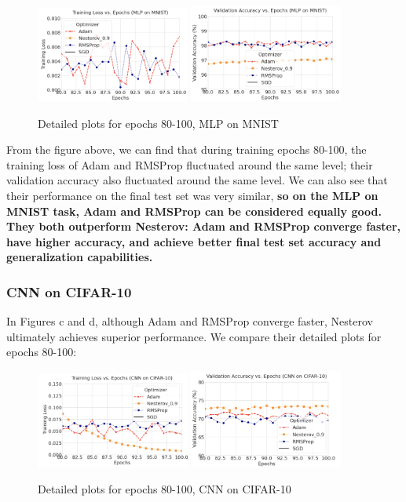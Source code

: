 \documentclass[12pt]{article}
\begin{document}
\begin{figure}[H]
    \centering
    \includegraphics[width=0.45\textwidth]{1-1.png}
    \includegraphics[width=0.45\textwidth]{1-2.png}
    \caption{Detailed plots for epochs 80-100, MLP on MNIST}
    \label{fig:detailed_mlp_on_mnist}
\end{figure}

From the figure above, we can find that during training epochs 80-100, the training loss of Adam and RMSProp fluctuated around the same level; their validation accuracy also fluctuated around the same level. We can also see that their performance on the final test set was very similar, \textbf{so on the MLP on MNIST task, Adam and RMSProp can be considered equally good. They both outperform Nesterov: Adam and RMSProp converge faster, have higher accuracy, and achieve better final test set accuracy and generalization capabilities.}


\subsubsection{CNN on CIFAR-10}

In Figures c and d, although Adam and RMSProp converge faster, Nesterov ultimately achieves superior performance. We compare their detailed plots for epochs 80-100:

\begin{figure}[H]
    \centering
    \includegraphics[width=0.45\textwidth]{2-1.png}
    \includegraphics[width=0.45\textwidth]{2-2.png}
    \caption{Detailed plots for epochs 80-100, CNN on CIFAR-10}
    \label{fig:detailed_cnn_on_cifar10}
\end{figure}
\end{document}
